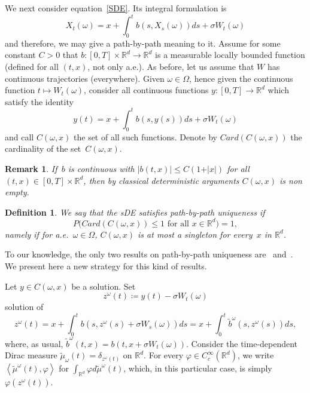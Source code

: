 \documentclass[a4paper,10pt]{article}
\newtheorem{definition}[theorem]{Definition}
\newtheorem{remark}[theorem]{Remark}
\newcommand\1{\mathbbm{1}}
\newcommand{\td}{\tilde}
\numberwithin{equation}{section}
\begin{document}
We next consider equation~\eqref{SDE}. Its integral formulation is 
\begin{equation*}
X_{t}(\omega)  =x+\int_{0}^{t}b(s,X_{s}(\omega)) ds+\sigma W_{t}(\omega)
\end{equation*}
and therefore, we may give a path-by-path meaning to it. Assume for some constant $C>0$ that $b \colon [0,T] \times \mathbb{R}^{d} \rightarrow \mathbb{R}^{d}$ is a measurable locally bounded function (defined for all $(t,x)$, not only a.e.). As before, let us assume that $W$ has continuous trajectories (everywhere). Given $\omega\in\Omega$, hence given the continuous function $t\mapsto W_{t}(\omega)$, consider all continuous functions $y \colon [0,T]  \rightarrow \mathbb{R}^{d}$ which satisfy the identity 
\begin{equation*}
y(t)  =x+\int_{0}^{t}b(  s,y(s)  ) ds+\sigma W_{t}(\omega)
\end{equation*}
and call $C(\omega,x)$ the set of all such functions. Denote by $Card(C(\omega,x))$ the cardinality of the set~$C(\omega,x)$.

\begin{remark}
If~$b$ is continuous with $\vert b(  t,x)  \vert \leq C(  1+\vert x\vert )$ for all $(t,x) \in [0,T] \times\mathbb{R}^{d}$, then by classical deterministic arguments $C(\omega,x)$ is non empty.
\end{remark}

\begin{definition}
We say that the sDE satisfies \emph{path-by-path uniqueness} if
\begin{equation*}
P\big(  Card(  C(\omega,x) ) \leq 1 \text{ for all } x\in\mathbb{R}^d \big)  =1,
\end{equation*}
namely if for a.e.~$\omega \in \Omega$, $C(\omega,x)$ is at most a singleton for every~$x$ in $\mathbb{R}^d$.
\end{definition}

To our knowledge, the only two results on path-by-path uniqueness are~\cite{DAVIE07} and~\cite{CATGUB13}. We present here a new strategy for this kind of results.

Let $y\in C(\omega,x)$ be a solution. Set
\[
z^\omega(t)  \coloneqq y(t)  -\sigma W_{t}(
\omega)
\]
solution of
\begin{equation*}
z^\omega(t)  =x+\int_{0}^{t}b(s,z^\omega(s)  +\sigma W_{s}(\omega)  )  ds =x+\int_{0}^{t}\widetilde{b}^\omega(s,z^\omega(s))  ds ,
\end{equation*}
where, as usual, $\td{b}^\omega(t,x)=b(t,x+\sigma W_t(\omega))$. Consider the time-dependent Dirac measure $\widetilde{\mu}_{\omega}(t)  =\delta_{z^\omega(t)  }$ on $\mathbb{R}^{d} 
$. For every $\varphi\in C_{c}^{\infty}(\mathbb{R}^{d})$, we write $\left\langle \widetilde{\mu}^\omega(t)  ,\varphi\right\rangle
$ for $\int_{\mathbb{R}^{d}}\varphi d\widetilde{\mu}^\omega(t)$, which, in this particular case, is simply $\varphi(z^\omega(t))$.
\end{document}
